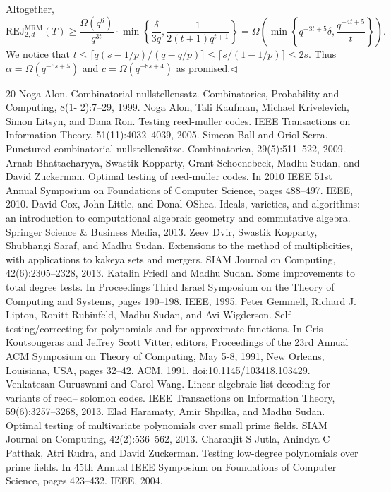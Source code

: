 \documentclass[10pt,a4paper]{article}
\begin{document}
Altogether,
\[\mathrm{REJ}_{2,d}^{\mathrm{MRM}}(T)\geq\frac{\Omega(q^6)}{q^{3t}}\cdot\min\left\{\frac\delta{3q},\frac1{2(t+1)q^{t+1}}\right\}=\Omega\left(\min\left\{q^{-3t+5}\delta,\frac{q^{-4t+5}}t\right\}\right).\]
We notice that $t\leq\lceil q(s-1/p)/(q-q/p)\rceil\leq\lceil s/(1-1/p)\rceil\leq2s$. Thus $\alpha=\Omega(q^{-6s+5})$ and $c=\Omega(q^{-8s+4})$ as promised.\hfill$\triangleleft$

\begin{thebibliography}{20}
 Noga Alon. Combinatorial nullstellensatz. Combinatorics, Probability and Computing, 8(1- 2):7–29, 1999.
 Noga Alon, Tali Kaufman, Michael Krivelevich, Simon Litsyn, and Dana Ron. Testing reed-muller codes. IEEE Transactions on Information Theory, 51(11):4032–4039, 2005.
 Simeon Ball and Oriol Serra. Punctured combinatorial nullstellensätze. Combinatorica, 29(5):511–522, 2009.
 Arnab Bhattacharyya, Swastik Kopparty, Grant Schoenebeck, Madhu Sudan, and David Zuckerman. Optimal testing of reed-muller codes. In 2010 IEEE 51st Annual Symposium on Foundations of Computer Science, pages 488–497. IEEE, 2010.
 David Cox, John Little, and Donal OShea. Ideals, varieties, and algorithms: an introduction to computational algebraic geometry and commutative algebra. Springer Science \& Business Media, 2013.
 Zeev Dvir, Swastik Kopparty, Shubhangi Saraf, and Madhu Sudan. Extensions to the method of multiplicities, with applications to kakeya sets and mergers. SIAM Journal on Computing, 42(6):2305–2328, 2013.
 Katalin Friedl and Madhu Sudan. Some improvements to total degree tests. In Proceedings Third Israel Symposium on the Theory of Computing and Systems, pages 190–198. IEEE, 1995.
 Peter Gemmell, Richard J. Lipton, Ronitt Rubinfeld, Madhu Sudan, and Avi Wigderson. Self-testing/correcting for polynomials and for approximate functions. In Cris Koutsougeras and Jeffrey Scott Vitter, editors, Proceedings of the 23rd Annual ACM Symposium on Theory of Computing, May 5-8, 1991, New Orleans, Louisiana, USA, pages 32–42. ACM, 1991. doi:10.1145/103418.103429.
 Venkatesan Guruswami and Carol Wang. Linear-algebraic list decoding for variants of reed– solomon codes. IEEE Transactions on Information Theory, 59(6):3257–3268, 2013.
 Elad Haramaty, Amir Shpilka, and Madhu Sudan. Optimal testing of multivariate polynomials over small prime fields. SIAM Journal on Computing, 42(2):536–562, 2013.
 Charanjit S Jutla, Anindya C Patthak, Atri Rudra, and David Zuckerman. Testing low-degree polynomials over prime fields. In 45th Annual IEEE Symposium on Foundations of Computer Science, pages 423–432. IEEE, 2004.

\end{thebibliography}
\end{document}
